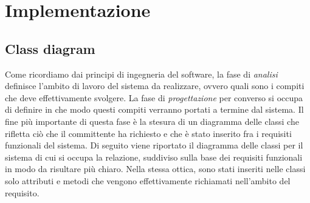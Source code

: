 \documentclass[12pt,a4paper,onecolumn,x11names]{article}
\begin{document}
\newpage
\section{Implementazione}
	\subsection{Class diagram}
	\begin{flushleft}
		Come ricordiamo dai principi di ingegneria del software, la fase di \textit{analisi} definisce l'ambito di lavoro del sistema da realizzare, ovvero quali sono i compiti che deve effettivamente svolgere. La fase di \textit{progettazione} per converso si occupa di definire in che modo questi compiti verranno portati a termine dal sistema.\newline
		Il fine più importante di questa fase è la stesura di un diagramma delle classi che rifletta ciò che il committente ha richiesto e che è stato inserito fra i requisiti funzionali del sistema.
		Di seguito viene riportato il diagramma delle classi per il sistema di cui si occupa la relazione, suddiviso sulla base dei requisiti funzionali in modo da risultare più chiaro. Nella stessa ottica, sono stati inseriti nelle classi solo attributi e metodi che vengono effettivamente richiamati nell'ambito del requisito.\newline\newline
	\end{flushleft}
\end{document}
